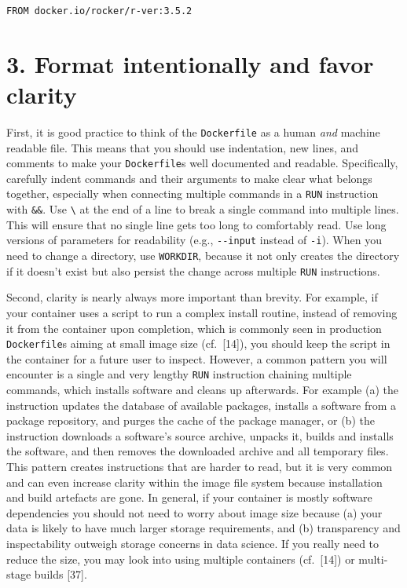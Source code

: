 \documentclass[10pt,letterpaper]{article}
\begin{document}
\begin{verbatim}
FROM docker.io/rocker/r-ver:3.5.2
\end{verbatim}

\hypertarget{format-intentionally-and-favor-clarity}{%
\section{3. Format intentionally and favor
clarity}\label{format-intentionally-and-favor-clarity}}

  \label{rule:formatting} 
  \label{rule:clarity} 

First, it is good practice to think of the \texttt{Dockerfile} as a
human \emph{and} machine readable file. This means that you should use
indentation, new lines, and comments to make your \texttt{Dockerfile}s
well documented and readable. Specifically, carefully indent commands
and their arguments to make clear what belongs together, especially when
connecting multiple commands in a \texttt{RUN} instruction with
\texttt{\&\&}. Use \texttt{\textbackslash{}} at the end of a line to
break a single command into multiple lines. This will ensure that no
single line gets too long to comfortably read. Use long versions of
parameters for readability (e.g., \texttt{-\/-input} instead of
\texttt{-i}). When you need to change a directory, use \texttt{WORKDIR},
because it not only creates the directory if it doesn't exist but also
persist the change across multiple \texttt{RUN} instructions.

Second, clarity is nearly always more important than brevity. For
example, if your container uses a script to run a complex install
routine, instead of removing it from the container upon completion,
which is commonly seen in production \texttt{Dockerfile}s aiming at
small image size (cf.~{[}14{]}), you should keep the script in the
container for a future user to inspect. However, a common pattern you
will encounter is a single and very lengthy \texttt{RUN} instruction
chaining multiple commands, which installs software and cleans up
afterwards. For example (a) the instruction updates the database of
available packages, installs a software from a package repository, and
purges the cache of the package manager, or (b) the instruction
downloads a software's source archive, unpacks it, builds and installs
the software, and then removes the downloaded archive and all temporary
files. This pattern creates instructions that are harder to read, but it
is very common and can even increase clarity within the image file
system because installation and build artefacts are gone. In general, if
your container is mostly software dependencies you should not need to
worry about image size because (a) your data is likely to have much
larger storage requirements, and (b) transparency and inspectability
outweigh storage concerns in data science. If you really need to reduce
the size, you may look into using multiple containers (cf.~{[}14{]}) or
multi-stage builds {[}37{]}.
\end{document}

